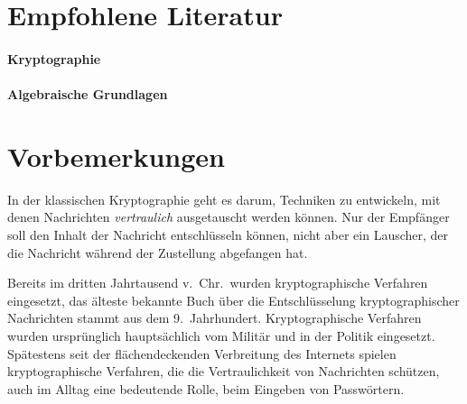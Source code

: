 
\chapter*{Empfohlene Literatur}

\subsubsection{Kryptographie}






\subsubsection{Algebraische Grundlagen}




\chapter*{Vorbemerkungen}

In der klassischen Kryptographie geht es darum, Techniken zu entwickeln, mit denen Nachrichten \emph{vertraulich} ausgetauscht werden können. Nur der Empfänger soll den Inhalt der Nachricht entschlüsseln können, nicht aber ein Lauscher, der die Nachricht während der Zustellung abgefangen hat.

Bereits im dritten Jahrtausend v.~Chr.~wurden kryptographische Verfahren eingesetzt, das älteste bekannte Buch über die Entschlüsselung kryptographischer Nachrichten stammt aus dem 9.~Jahrhundert. Kryptographische Verfahren wurden ursprünglich hauptsächlich vom Militär und in der Politik eingesetzt. Spätestens seit der flächendeckenden Verbreitung des Internets spielen kryptographische Verfahren, die die Vertraulichkeit von Nachrichten schützen, auch im Alltag eine bedeutende Rolle, \zB beim Eingeben von Passwörtern.

